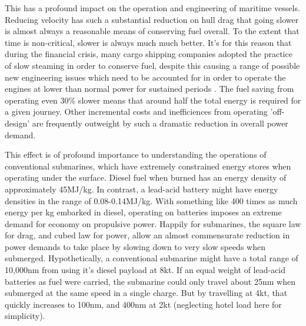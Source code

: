 \documentclass{article}\usepackage[]{graphicx}\usepackage[]{color}
\begin{document}
This has a profound impact on the operation and engineering of maritime vessels.  Reducing velocity has such a substantial reduction on hull drag that going slower is almost always a reasonable means of conserving fuel overall.  To the extent that time is non-critical, slower is always much much better.  It's for this reason that during the financial crisis, many cargo shipping companies adopted the practice of slow steaming \parencite{liang2014} in order to conserve fuel, despite this causing a range of possible new engineering issues which need to be accounted for in order to operate the engines at lower than normal power for sustained periods \parencite[8-10]{sanguri2012}. The fuel saving from operating even 30\% slower means that around half the total energy is required for a given journey.  Other incremental costs and inefficiences from operating 'off-design' are frequently outweight by such a dramatic reduction in overall power demand.

This effect is of profound importance to understanding the operations of conventional submarines, which have extremely constrained energy stores when operating under the surface. Diesel fuel when burned has an energy density of approximately 45MJ/kg.  In contrast, a lead-acid battery might have energy densities in the range of 0.08-0.14MJ/kg. With something like 400 times as much energy per kg embarked in diesel, operating on batteries imposes an extreme demand for economy on propulsive power.  Happily for submarines, the square law for drag, and cubed law for power, allow an almost commensurate reduction in power demands to take place by slowing down to very slow speeds when submerged. Hypothetically, a conventional submarine might have a total range of 10,000nm from using it's diesel payload at 8kt.  If an equal weight of lead-acid batteries as fuel were carried, the submarine could only travel about 25nm when submerged at the same speed in a single charge.  But by travelling at 4kt, that quickly increases to 100nm, and 400nm at 2kt (neglecting hotel load here for simplicity).
\end{document}
